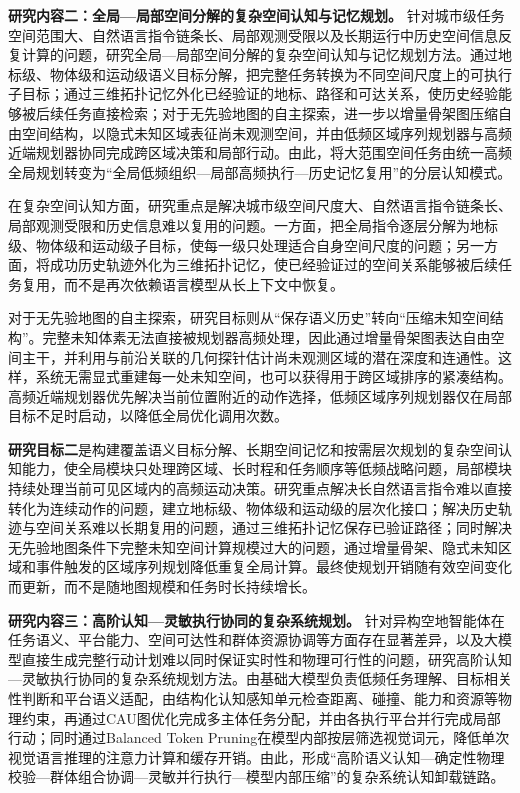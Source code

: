 \textbf{研究内容二：全局—局部空间分解的复杂空间认知与记忆规划。} 针对城市级任务空间范围大、自然语言指令链条长、局部观测受限以及长期运行中历史空间信息反复计算的问题，研究全局—局部空间分解的复杂空间认知与记忆规划方法。通过地标级、物体级和运动级语义目标分解，把完整任务转换为不同空间尺度上的可执行子目标；通过三维拓扑记忆外化已经验证的地标、路径和可达关系，使历史经验能够被后续任务直接检索；对于无先验地图的自主探索，进一步以增量骨架图压缩自由空间结构，以隐式未知区域表征尚未观测空间，并由低频区域序列规划器与高频近端规划器协同完成跨区域决策和局部行动。由此，将大范围空间任务由统一高频全局规划转变为“全局低频组织—局部高频执行—历史记忆复用”的分层认知模式。

在复杂空间认知方面，研究重点是解决城市级空间尺度大、自然语言指令链条长、局部观测受限和历史信息难以复用的问题。一方面，把全局指令逐层分解为地标级、物体级和运动级子目标，使每一级只处理适合自身空间尺度的问题；另一方面，将成功历史轨迹外化为三维拓扑记忆，使已经验证过的空间关系能够被后续任务复用，而不是再次依赖语言模型从长上下文中恢复。

对于无先验地图的自主探索，研究目标则从“保存语义历史”转向“压缩未知空间结构”。完整未知体素无法直接被规划器高频处理，因此通过增量骨架图表达自由空间主干，并利用与前沿关联的几何探针估计尚未观测区域的潜在深度和连通性。这样，系统无需显式重建每一处未知空间，也可以获得用于跨区域排序的紧凑结构。高频近端规划器优先解决当前位置附近的动作选择，低频区域序列规划器仅在局部目标不足时启动，以降低全局优化调用次数。

\textbf{研究目标二}是构建覆盖语义目标分解、长期空间记忆和按需层次规划的复杂空间认知能力，使全局模块只处理跨区域、长时程和任务顺序等低频战略问题，局部模块持续处理当前可见区域内的高频运动决策。研究重点解决长自然语言指令难以直接转化为连续动作的问题，建立地标级、物体级和运动级的层次化接口；解决历史轨迹与空间关系难以长期复用的问题，通过三维拓扑记忆保存已验证路径；同时解决无先验地图条件下完整未知空间计算规模过大的问题，通过增量骨架、隐式未知区域和事件触发的区域序列规划降低重复全局计算。最终使规划开销随有效空间变化而更新，而不是随地图规模和任务时长持续增长。

\textbf{研究内容三：高阶认知—灵敏执行协同的复杂系统规划。} 针对异构空地智能体在任务语义、平台能力、空间可达性和群体资源协调等方面存在显著差异，以及大模型直接生成完整行动计划难以同时保证实时性和物理可行性的问题，研究高阶认知—灵敏执行协同的复杂系统规划方法。由基础大模型负责低频任务理解、目标相关性判断和平台语义适配，由结构化认知感知单元检查距离、碰撞、能力和资源等物理约束，再通过CAU图优化完成多主体任务分配，并由各执行平台并行完成局部行动；同时通过Balanced Token Pruning在模型内部按层筛选视觉词元，降低单次视觉语言推理的注意力计算和缓存开销。由此，形成“高阶语义认知—确定性物理校验—群体组合协调—灵敏并行执行—模型内部压缩”的复杂系统认知卸载链路。

